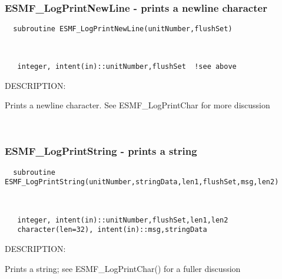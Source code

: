 \mbox{}\hrulefill\ 
 

   \subsubsection [ESMF\_LogPrintNewLine] {ESMF\_LogPrintNewLine - prints a newline character}


  
\begin{verbatim}  subroutine ESMF_LogPrintNewLine(unitNumber,flushSet)\end{verbatim}
 
 
\mbox{}\hrulefill\ 
 

\begin{verbatim}   integer, intent(in)::unitNumber,flushSet  !see above\end{verbatim}
{\sf DESCRIPTION:\\ }


   Prints a newline character.  See ESMF\_LogPrintChar for more 
   discussion 
 
\mbox{}\hrulefill\ 
 

  \subsubsection [ESMF\_LogPrintString] {ESMF\_LogPrintString - prints a string}


  
\begin{verbatim}  subroutine ESMF_LogPrintString(unitNumber,stringData,len1,flushSet,msg,len2)\end{verbatim}
 
 
\mbox{}\hrulefill\ 
 

\begin{verbatim}   integer, intent(in)::unitNumber,flushSet,len1,len2
   character(len=32), intent(in)::msg,stringData\end{verbatim}
{\sf DESCRIPTION:\\ }


   Prints a string; see ESMF\_LogPrintChar() for a fuller discussion 
 
